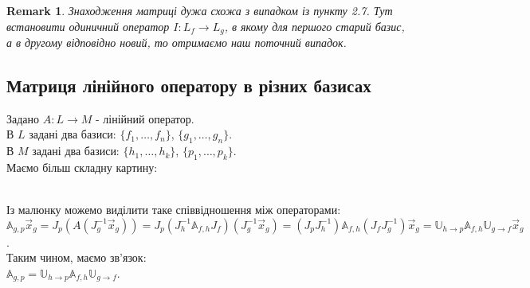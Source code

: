 \documentclass[a4paper, 10pt]{article}
\theoremstyle{theoremdd}
\theoremstyle{theoremdd}
\theoremstyle{theoremdd}
\theoremstyle{theoremdd}
\theoremstyle{theoremdd}
\theoremstyle{theoremdd}
\newtheorem{remark}[theorem]{Remark}
\theoremstyle{theoremdd}
\theoremstyle{theoremdd}
\begin{document}
\begin{remark}
Знаходження матриці дужа схожа з випадком із пункту 2.7. Тут встановити одиничний оператор $I: L_f \to L_g$, в якому для першого старий базис, а в другому відповідно новий, то отримаємо наш поточний випадок.
\end{remark}

\subsection{Матриця лінійного оператору в різних базисах}
Задано $A: L \to M$ - лінійний оператор.\\
В $L$ задані два базиси: $\{f_1,\dots, f_n\}$, $\{g_1, \dots, g_n\}$.\\
В $M$ задані два базиси: $\{h_1,\dots, h_k\}$, $\{p_1, \dots, p_k\}$.\\
Маємо більш складну картину:\\
\\
Із малюнку можемо виділити таке співвідношення між операторами:\\
$\mathbb{A}_{g,p} \vec{x}_g = J_p(A(J_g^{-1} \vec{x}_g)) = J_p(J_h^{-1} \mathbb{A}_{f,h} J_f)(J_g^{-1} \vec{x}_g) = (J_p J_h^{-1}) \mathbb{A}_{f,h} (J_f J_g^{-1})\vec{x}_g = \mathbb{U}_{h \to p} \mathbb{A}_{f,h} \mathbb{U}_{g \to f} \vec{x}_g$.\\
Таким чином, маємо зв'язок:\\
$\mathbb{A}_{g,p} = \mathbb{U}_{h \to p} \mathbb{A}_{f,h} \mathbb{U}_{g \to f}$.
\end{document}
